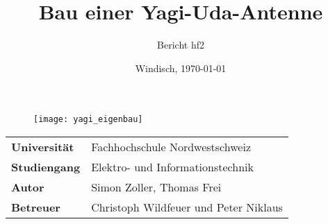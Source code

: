 \documentclass[final]{fhnwreport}       %
\title{Bau einer Yagi-Uda-Antenne}          %
\author{Bericht hf2}          %
\date{Windisch, \today}             %
\begin{document}
\maketitle

\vspace*{-1cm}						    %
\vfill
\begin{figure}[H]
\centering
\texttt{[image: yagi\_eigenbau]}
\end{figure}
\vfill

{
\renewcommand\arraystretch{2}
\begin{center}
\begin{tabular}{>{\bf}p{4cm} l}
Universität                &    Fachhochschule Nordwestschweiz\\
Studiengang                &    Elektro- und Informationstechnik\\
Autor   		               & 	  Simon Zoller, Thomas Frei\\
Betreuer                   &    Christoph Wildfeuer und Peter Niklaus\\
\end{tabular}
\end{center}
}

\clearpage

\thispagestyle{empty}


\tableofcontents
\clearpage










{\sloppypar
\printbibliography[heading=bibintoc]
\label{sec:lit}
}

%

{%
}
\end{document}
